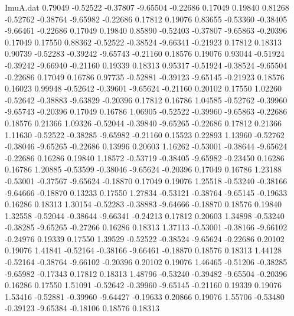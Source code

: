 \begin{filecontents}{ImuA.dat}
   0.79049   -0.52522   -0.37807   -9.65504   -0.22686    0.17049    0.19840
   0.81268   -0.52762   -0.38764   -9.65982   -0.22686    0.17812    0.19076
   0.83655   -0.53360   -0.38405   -9.66461   -0.22686    0.17049    0.19840
   0.85890   -0.52403   -0.37807   -9.65863   -0.20396    0.17049    0.17550
   0.88362   -0.52522   -0.38524   -9.66341   -0.21923    0.17812    0.18313
   0.90739   -0.52283   -0.39242   -9.65743   -0.21160    0.18576    0.19076
   0.93044   -0.51924   -0.39242   -9.66940   -0.21160    0.19339    0.18313
   0.95317   -0.51924   -0.38524   -9.65504   -0.22686    0.17049    0.16786
   0.97735   -0.52881   -0.39123   -9.65145   -0.21923    0.18576    0.16023
   0.99948   -0.52642   -0.39601   -9.65624   -0.21160    0.20102    0.17550
   1.02260   -0.52642   -0.38883   -9.63829   -0.20396    0.17812    0.16786
   1.04585   -0.52762   -0.39960   -9.65743   -0.20396    0.17049    0.16786
   1.06905   -0.52522   -0.39960   -9.65863   -0.22686    0.18576    0.21366
   1.09326   -0.52044   -0.39840   -9.65265   -0.22686    0.17812    0.21366
   1.11630   -0.52522   -0.38285   -9.65982   -0.21160    0.15523    0.22893
   1.13960   -0.52762   -0.38046   -9.65265   -0.22686    0.13996    0.20603
   1.16262   -0.53001   -0.38644   -9.65624   -0.22686    0.16286    0.19840
   1.18572   -0.53719   -0.38405   -9.65982   -0.23450    0.16286    0.16786
   1.20885   -0.53599   -0.38046   -9.65624   -0.20396    0.17049    0.16786
   1.23188   -0.53001   -0.37567   -9.65624   -0.18870    0.17049    0.19076
   1.25518   -0.53240   -0.38166   -9.64666   -0.18870    0.13233    0.17550
   1.27834   -0.53121   -0.38764   -9.65145   -0.19633    0.16286    0.18313
   1.30154   -0.52283   -0.38883   -9.64666   -0.18870    0.18576    0.19840
   1.32558   -0.52044   -0.38644   -9.66341   -0.24213    0.17812    0.20603
   1.34898   -0.53240   -0.38285   -9.65265   -0.27266    0.16286    0.18313
   1.37113   -0.53001   -0.38166   -9.66102   -0.24976    0.19339    0.17550
   1.39529   -0.52522   -0.38524   -9.65624   -0.22686    0.20102    0.19076
   1.41841   -0.52164   -0.38166   -9.66461   -0.18870    0.18576    0.18313
   1.44128   -0.52164   -0.38764   -9.66102   -0.20396    0.20102    0.19076
   1.46465   -0.51206   -0.38285   -9.65982   -0.17343    0.17812    0.18313
   1.48796   -0.53240   -0.39482   -9.65504   -0.20396    0.16286    0.17550
   1.51091   -0.52642   -0.39960   -9.65145   -0.21160    0.19339    0.19076
   1.53416   -0.52881   -0.39960   -9.64427   -0.19633    0.20866    0.19076
   1.55706   -0.53480   -0.39123   -9.65384   -0.18106    0.18576    0.18313

\end{filecontents}
